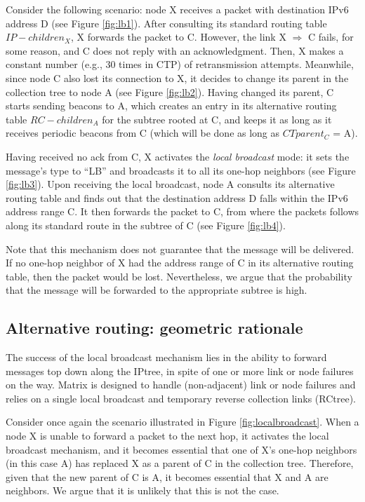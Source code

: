 Consider the following scenario: node X receives a packet with destination IPv6
address D (see Figure \ref{fig:lb1}). After consulting its standard routing
table $IP-children_X$, X forwards the packet to C. However, the link X
$\Rightarrow$ C fails, for some reason, and C does not reply with an
acknowledgment.
Then, X makes a constant number (e.g., 30 times in CTP) of retransmission
attempts. Meanwhile, since node C also lost its connection to X, it decides to
change its parent in the collection tree to node A (see Figure \ref{fig:lb2}).
Having changed its parent, C starts sending beacons to A, which creates an entry
in its alternative routing table $RC-children_A$ for the subtree rooted at C, and
keeps it as long as it receives periodic beacons from C (which will be done as long as $CTparent_C$ = A).

Having received no ack from C, X activates the \textit{local
broadcast} mode: it sets the message's type to ``LB'' and broadcasts
it to all its one-hop neighbors (see Figure \ref{fig:lb3}). Upon
receiving the local broadcast, node A consults its alternative
routing table and finds out that the destination address D falls
within the IPv6 address range C. It then forwards the packet to C,
from where the packets follows along its standard route in the
subtree of C (see Figure \ref{fig:lb4}).

Note that this
mechanism does not guarantee that the message will be delivered. If no one-hop
neighbor of X had the address range of C in its alternative routing table, then
the packet would be lost. Nevertheless, we argue that the probability that the
message will be forwarded to the appropriate subtree is high.

\subsection{Alternative routing: geometric rationale}

The success of the local broadcast mechanism lies in the ability to forward
messages top down along the IPtree, in spite of one or more link or node
failures on the way.
Matrix is designed to handle (non-adjacent) link or node failures and relies on
a single local broadcast and temporary reverse collection links (RCtree).

Consider once again the scenario illustrated in Figure \ref{fig:localbroadcast}.
When a node X is unable to forward a packet to the next hop, it activates the
local broadcast mechanism, and it becomes essential that one of X's one-hop
neighbors (in this case A) has replaced X as a parent of C in
the collection tree. Therefore, given that the new parent of C is A, it becomes
essential that X and A are neighbors. We argue that it is unlikely that this is not the case.

